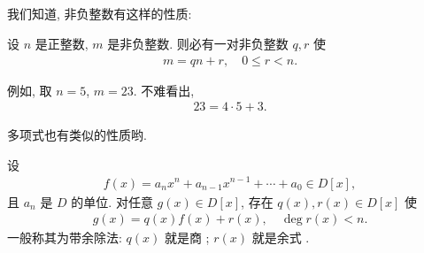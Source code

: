 \subsection*{\DivisionAlgorithm}
\markright{\DivisionAlgorithm}

我们知道, 非负整数有这样的性质:

\begin{proposition}
    设 $n$ 是正整数, $m$ 是非负整数. 则必有一对非负整数 $q,r$ 使
    \begin{align*}
        m = qn + r, \quad 0 \leq r < n.
    \end{align*}
\end{proposition}

例如, 取 $n=5$, $m=23$. 不难看出,
\begin{align*}
    23 = 4 \cdot 5 + 3.
\end{align*}

多项式也有类似的性质哟.

\begin{proposition}
    设
    \begin{align*}
        f(x) = a_n x^n + a_{n-1} x^{n-1} + \cdots + a_0 \in D[x],
    \end{align*}
    且 $a_n$ 是 $D$ 的单位. 对任意 $g(x) \in D[x]$, 存在 $q(x), r(x) \in D[x]$ 使
    \begin{align*}
        g(x) = q(x) f(x) + r(x), \quad \deg r(x) < n.
    \end{align*}
    一般称其为带余除法: $q(x)$ 就是商 ; $r(x)$ 就是余式 .
\end{proposition}

